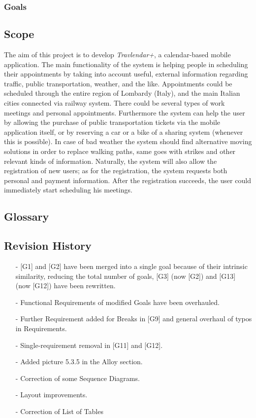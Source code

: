 \documentclass[12pt, a4paper]{article}
\begin{document}
		\subsubsection{Goals}
			
		
		\subsection{Scope}
		The aim of this project is to develop \textit{Travlendar+}, a calendar-based mobile application. 
		The main functionality of the system is helping people in scheduling their appointments by taking into account useful, external information regarding traffic, public transportation, weather, and the like. 
		Appointments could be scheduled through the entire region of Lombardy (Italy), and the main Italian cities connected via railway system. There could be several types of work meetings and personal appointments.
		Furthermore the system can help the user by allowing the purchase of public transportation tickets via the mobile application itself, or by reserving a car or a bike of a sharing system (whenever this is possible). In case of bad weather the system should find alternative moving solutions in order to replace walking paths, same goes with strikes and other relevant kinds of information. 
		Naturally, the system will also allow the registration of new users; as for the registration, the system requests both personal and payment information. After the registration succeeds, the user could immediately start scheduling his meetings.
		
		\subsection{Glossary}
			
		
		\subsection{Revision History}
		\begin{itemize}
			\item[-] [G1] and [G2] have been merged into a single goal because of their intrinsic similarity, reducing the total number of goals, [G3] (now [G2]) and [G13] (now [G12]) have been rewritten.
			\item[-] Functional Requirements of modified Goals have been overhauled.
			\item[-] Further Requirement added for Breaks in [G9] and general overhaul of typos in Requirements.
			\item[-] Single-requirement removal in [G11] and [G12].
			\item[-] Added picture 5.3.5 in the Alloy section.
			\item[-] Correction of some Sequence Diagrams.
			\item[-] Layout improvements.
			\item[-] Correction of List of Tables
		\end{itemize}
			
\end{document}
